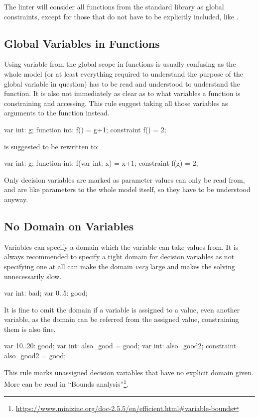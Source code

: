 \documentclass[a4paper,12pt]{article}
\newcommand{\mi}[1]{\mbox{\mzninline{#1}}}
\begin{document}
The linter will consider all functions from the standard library as global constraints,
except for those that do not have to be explicitly included, like \mi{forall}.

\subsection{Global Variables in Functions}\label{sec:rule:globalfun}
Using variable from the global scope in functions is usually confusing as the whole model
(or at least everything required to understand the purpose of the global variable in
question) has to be read and understood to understand the function. It is also not
immediately as clear as to what variables a function is constraining and accessing. This rule
suggest taking all those variables as arguments to the function instead.

\begin{mznnobreak}
var int: g;
function int: f() = g+1;
constraint f() = 2;
\end{mznnobreak}
is suggested to be rewritten to:
\begin{mznnobreak}
var int: g;
function int: f(var int: x) = x+1;
constraint f(g) = 2;
\end{mznnobreak}

Only decision variables are marked as parameter values can only be read from, and are like
parameters to the whole model itself, so they have to be understood anyway.

\subsection{No Domain on Variables}\label{sec:rule:nodomain}
Variables can specify a domain which the variable can take values from. It is always
recommended to specify a tight domain for decision variables as not specifying one at all
can make the domain \emph{very} large and makes the solving unnecessarily slow.
\begin{mznnobreak}
var int: bad;
var 0..5: good;
\end{mznnobreak}
It is fine to omit the domain if a variable is assigned to a value, even another variable,
as the domain can be referred from the assigned value, constraining them is also fine.
\begin{mznnobreak}
var 10..20: good;
var int: also_good = good;
var int: also_good2;
constraint also_good2 = good;
\end{mznnobreak}
This rule marks unassigned decision variables that have no explicit domain given.
More can be read in ``Bounds analysis''\footnote{\url{https://www.minizinc.org/doc-2.5.5/en/efficient.html\#variable-bounds}}.
\end{document}
